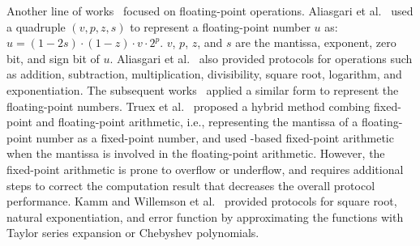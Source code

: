Another line of works~\cite{aliasgari2012secure,krips2014hybrid,kamm2015secure,rathee2022secfloat} focused on floating-point operations.
Aliasgari et al.~\cite{aliasgari2012secure} used a quadruple $\left(v, p, z, s\right) $ to represent a floating-point number $u$ as: $u= \left(1-2s\right) \cdot \left(1-z\right) \cdot v \cdot 2^p$. $v$, $p$, $z$, and $s$ are the mantissa, exponent, zero bit, and sign bit of $u$. Aliasgari et al.~\cite{aliasgari2012secure} also provided \smpc protocols for operations such as addition, subtraction, multiplication, divisibility, square root, logarithm, and exponentiation.
The subsequent works~\cite{krips2014hybrid,kamm2015secure,rathee2022secfloat} applied a similar form to represent the floating-point numbers.
Truex et al.~\cite{truex2019hybrid} proposed a hybrid method combing fixed-point and floating-point arithmetic, i.e., representing the mantissa of a floating-point number as a fixed-point number, and used \lsss-based fixed-point arithmetic when the mantissa is involved in the floating-point arithmetic. However, the fixed-point arithmetic is prone to overflow or underflow, and requires additional steps to correct the computation result that decreases the overall protocol performance.
Kamm and Willemson et al.~\cite{kamm2015secure} provided \smpc protocols for square root, natural exponentiation, and error function by approximating the functions with Taylor series expansion or Chebyshev polynomials.

